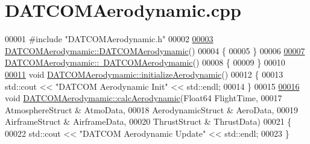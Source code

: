 \hypertarget{_d_a_t_c_o_m_aerodynamic_8cpp_source}{}\section{D\+A\+T\+C\+O\+M\+Aerodynamic.\+cpp}
\label{_d_a_t_c_o_m_aerodynamic_8cpp_source}

\begin{DoxyCode}
00001 \textcolor{preprocessor}{#include "DATCOMAerodynamic.h"}
00002 
\hyperlink{group___aerodynamic_a03d01a72cf389483e03e2bf6cce33299}{00003} \hyperlink{group___aerodynamic_a03d01a72cf389483e03e2bf6cce33299}{DATCOMAerodymamic::DATCOMAerodymamic}()
00004 \{
00005 \}
00006 
\hyperlink{group___aerodynamic_a3619e38867cad4b0c8b06a939281a74e}{00007} \hyperlink{group___aerodynamic_a3619e38867cad4b0c8b06a939281a74e}{DATCOMAerodymamic::~DATCOMAerodymamic}()
00008 \{
00009 \}
00010 
\hyperlink{group___aerodynamic_ad3c279c14de819e19e443568d7d46aff}{00011} \textcolor{keywordtype}{void} \hyperlink{group___aerodynamic_ad3c279c14de819e19e443568d7d46aff}{DATCOMAerodymamic::initializeAerodynamic}()
00012 \{
00013     std::cout << \textcolor{stringliteral}{"DATCOM Aerodynamic Init"} << std::endl;
00014 \}
00015 
\hyperlink{group___aerodynamic_a2c31940a25ec9396657d701ef3004327}{00016} \textcolor{keywordtype}{void} \hyperlink{group___aerodynamic_a2c31940a25ec9396657d701ef3004327}{DATCOMAerodymamic::calcAerodynamic}(Float64 FlightTime,
00017                                         AtmosphereStruct & AtmoData,
00018                                         AerodynamicStruct & AeroData,
00019                                         AirframeStruct & AirframeData,
00020                                         ThrustStruct & ThrustData)
00021 \{
00022     std::cout << \textcolor{stringliteral}{"DATCOM Aerodynamic Update"} << std::endl;
00023 \}
\end{DoxyCode}
